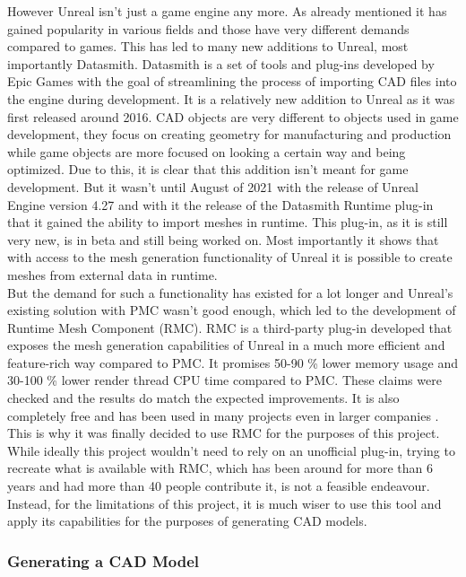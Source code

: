 However Unreal isn't just a game engine any more. As already mentioned it has gained popularity in various fields and those have very different demands compared to games. This has led to many new additions to Unreal, most importantly Datasmith. Datasmith is a set of tools and plug-ins developed by Epic Games with the goal of streamlining the process of importing CAD files into the engine during development. It is a relatively new addition to Unreal as it was first released around 2016. CAD objects are very different to objects used in game development, they focus on creating geometry for manufacturing and production while game objects are more focused on looking a certain way and being optimized. Due to this, it is clear that this addition isn't meant for game development. But it wasn't until August of 2021 with the release of Unreal Engine version 4.27 and with it the release of the Datasmith Runtime plug-in that it gained the ability to import meshes in runtime. This plug-in, as it is still very new, is in beta and still being worked on. Most importantly it shows that with access to the mesh generation functionality of Unreal it is possible to create meshes from external data in runtime.\\ 

But the demand for such a functionality has existed for a lot longer and Unreal's existing solution with PMC wasn't good enough, which led to the development of Runtime Mesh Component (RMC). RMC is a third-party plug-in developed that exposes the mesh generation capabilities of Unreal in a much more efficient and feature-rich way compared to PMC. It promises 50-90 \% lower memory usage and 30-100 \% lower render thread CPU time \cite{} compared to PMC. These claims were checked and the results do match the expected improvements. It is also completely free and has been used in many projects even in larger companies \cite{}. This is why it was finally decided to use RMC for the purposes of this project. While ideally this project wouldn't need to rely on an unofficial plug-in, trying to recreate what is available with RMC, which has been around for more than 6 years and had more than 40 people contribute it, is not a feasible endeavour. Instead, for the limitations of this project, it is much wiser to use this tool and apply its  capabilities for the purposes of generating CAD models.

\subsubsection{Generating a CAD Model}


